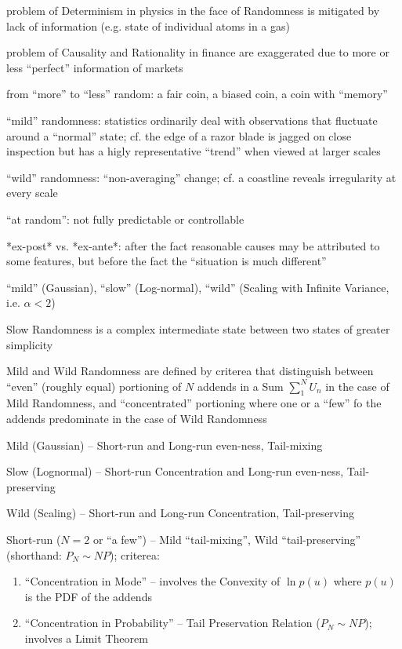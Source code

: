problem of Determinism in physics in the face of Randomness is mitigated by lack
of information (e.g. state of individual atoms in a gas)

problem of Causality and Rationality in finance are exaggerated due to more or
less ``perfect'' information of markets

from ``more'' to ``less'' random: a fair coin, a biased coin, a coin with
``memory''

``mild'' randomness: statistics ordinarily deal with observations that fluctuate
around a ``normal'' state; cf. the edge of a razor blade is jagged on close
inspection but has a higly representative ``trend'' when viewed at larger scales

``wild'' randomness: ``non-averaging'' change; cf. a coastline reveals
irregularity at every scale

``at random'': not fully predictable or controllable

*ex-post* vs. *ex-ante*: after the fact reasonable causes may be attributed to
some features, but before the fact the ``situation is much different''

``mild'' (Gaussian), ``slow'' (Log-normal), ``wild'' (Scaling with Infinite
Variance, i.e. $\alpha < 2$)

Slow Randomness is a complex intermediate state between two states of greater
simplicity

Mild and Wild Randomness are defined by criterea that distinguish between
``even'' (roughly equal) portioning of $N$ addends in a Sum $\sum_1^N U_n$ in
the case of Mild Randomness, and ``concentrated'' portioning where one or a
``few'' fo the addends predominate in the case of Wild Randomness

Mild (Gaussian) -- Short-run and Long-run even-ness, Tail-mixing

Slow (Lognormal) -- Short-run Concentration and Long-run even-ness,
Tail-preserving

Wild (Scaling) -- Short-run and Long-run Concentration, Tail-preserving

Short-run ($N=2$ or ``a few'') -- Mild ``tail-mixing'', Wild
``tail-preserving'' (shorthand: $P_N \sim N P$); criterea:
\begin{enumerate}
  \item ``Concentration in Mode'' -- involves the Convexity of $\ln p(u)$ where
    $p(u)$ is the PDF of the addends
  \item ``Concentration in Probability'' -- Tail Preservation Relation
    ($P_N \sim N P$); involves a Limit Theorem
\end{enumerate}

